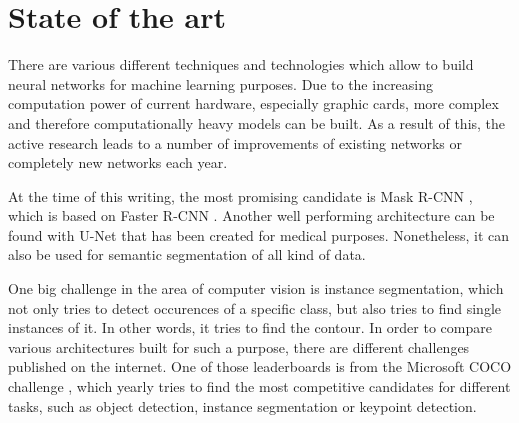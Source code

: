 
\chapter{State of the art}

There are various different techniques and technologies which allow to build neural networks for machine learning purposes. Due to the increasing computation power of current hardware, especially graphic cards, more complex and therefore computationally heavy models can be built. As a result of this, the active research leads to a number of improvements of existing networks or completely new networks each year.

At the time of this writing, the most promising candidate is Mask R-CNN \cite{He.20170405}, which is based on Faster R-CNN \cite{Ren.20160106}.
Another well performing architecture can be found with U-Net \cite{Ronneberger.20150518b} that has been created for medical purposes. Nonetheless, it can also be used for semantic segmentation of all kind of data.

One big challenge in the area of computer vision is instance segmentation, which not only tries to detect occurences of a specific class, but also tries to find single instances of it. In other words, it tries to find the contour. In order to compare various architectures built for such a purpose, there are different challenges published on the internet. One of those leaderboards is from the Microsoft COCO challenge \cite{Lin.20150221}, which yearly tries to find the most competitive candidates for different tasks, such as object detection, instance segmentation or keypoint detection.